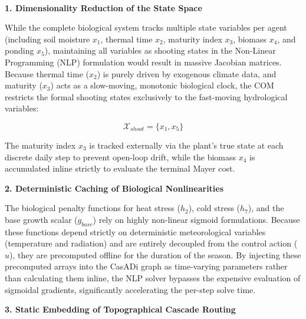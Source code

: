 \documentclass[11pt, a4paper]{article}
\begin{document}
\\
\textbf{1. Dimensionality Reduction of the State Space}

While the complete biological system tracks multiple state variables per agent (including soil moisture $x_1$, thermal time $x_2$, maturity index $x_3$, biomass $x_4$, and ponding $x_5$), maintaining all variables as shooting states in the Non-Linear Programming (NLP) formulation would result in massive Jacobian matrices. Because thermal time ($x_2$) is purely driven by exogenous climate data, and maturity ($x_3$) acts as a slow-moving, monotonic biological clock, the COM restricts the formal shooting states exclusively to the fast-moving hydrological variables:

\begin{equation}
    \mathcal{X}_{shoot} = \{x_1, x_5\}
\end{equation}

The maturity index $x_3$ is tracked externally via the plant's true state at each discrete daily step to prevent open-loop drift, while the biomass $x_4$ is accumulated inline strictly to evaluate the terminal Mayer cost.

\textbf{2. Deterministic Caching of Biological Nonlinearities}

The biological penalty functions for heat stress ($h_2$), cold stress ($h_7$), and the base growth scalar ($g_{base}$) rely on highly non-linear sigmoid formulations. Because these functions depend strictly on deterministic meteorological variables (temperature and radiation) and are entirely decoupled from the control action ($u$), they are precomputed offline for the duration of the season. By injecting these precomputed arrays into the CasADi graph as time-varying parameters rather than calculating them inline, the NLP solver bypasses the expensive evaluation of sigmoidal gradients, significantly accelerating the per-step solve time.

\textbf{3. Static Embedding of Topographical Cascade Routing}
\end{document}
